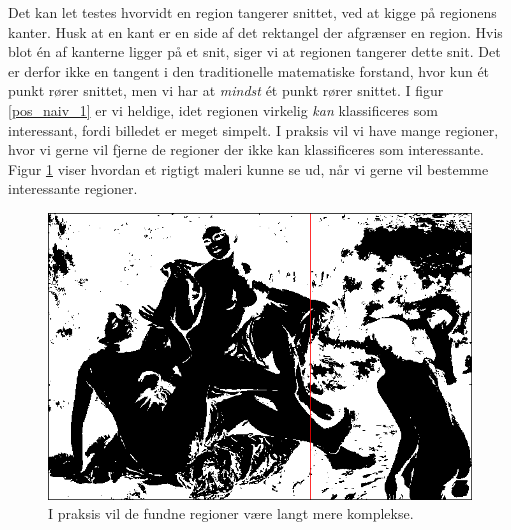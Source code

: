 {Det kan let testes hvorvidt en region tangerer snittet, ved at kigge på
regionens kanter. Husk at en kant er en side af det rektangel der
afgrænser en region. Hvis blot én af kanterne ligger på et snit, siger
vi at regionen tangerer dette snit. Det er derfor ikke en tangent i
den traditionelle matematiske forstand, hvor kun ét punkt rører snittet,
men vi har at \emph{mindst} ét punkt rører snittet.  I figur
\ref{pos_naiv_1} er vi heldige, idet regionen virkelig \emph{kan}
klassificeres som interessant, fordi billedet er meget simpelt.  I praksis
vil vi have mange regioner, hvor vi gerne vil fjerne de regioner der
ikke kan klassificeres som interessante.  Figur \ref{realworld_example}
viser hvordan et rigtigt maleri kunne se ud, når vi gerne vil bestemme
interessante regioner.
\begin{figure}[p]
	\begin{center}
		\includegraphics[scale=0.42,angle=0]{afsnit/vores_implementation/billeder/naiv_algoritme/bathers_mockup_blob}
	\end{center}
	\caption[Interessante regioner i praksis]{I praksis vil de
	fundne regioner være langt mere komplekse.}
	\label{realworld_example}
\end{figure}

}

